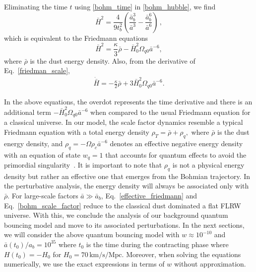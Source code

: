 \documentclass[a4paper,11pt]{article}
\newcommand{\dpar}[1]{\left(#1 \right)}
\begin{document}
Eliminating the time $t$ using \eqref{bohm_time} in \eqref{bohm_hubble}, we find
\begin{equation}
	\label{friedman_scale}
	\bar{H}^{2} = \frac{ 4 }{ 9t^{2}_{b}}\dpar
	{ \frac{ \bar{a}^{3}_{b} }{ \bar{a}^{3} } - \frac{\bar{a}_{b}^{6}}{ \bar{a}^{6} } }\, ,
\end{equation}
which is equivalent to the Friedmann equations
\begin{equation}\label{effective_friedmann}
	\bar{H}^{2} = \frac{\kappa}{ 3 }\bar\rho - \bar{H}^{2}_{0}\Omega_{q0}\bar{a}^{-6},
\end{equation}
where $\bar\rho$ is the dust energy density. {\color{red} Also, from the derivative of
		Eq.~\eqref{friedman_scale},
		\begin{align}
			\dot{\bar{H}} = - \frac{\kappa}{2} \bar\rho + 3\bar{H}^{2}_{0}\Omega_{q0}\bar{a}^{-6}.
		\end{align}
	}

In the above equations, {\color{red} the overdot represents the time derivative and} there is an additional term
$-\bar{H}^{2}_{0}\Omega_{q0}\bar{a}^{-6}$ when compared to the usual Friedmann equation
for a classical universe. {\color{red} In our model, the scale factor dynamics resemble
		a typical Friedmann equation with a total energy density $\rho_{T} = \bar{\rho} +
			\rho_{q},$ where $\bar{\rho}$ is the dust energy density, and $\rho_{q} = -\Omega
			\rho_{c} \bar{a}^{-6}$ denotes an effective negative energy density with an equation of
		state $w_q = 1$ that accounts for quantum effects to avoid the primordial
		singularity~\cite{vitenti2012large}. It is important to note that $\rho_{q}$ is not a
		physical energy density but rather an effective one that emerges from the Bohmian trajectory. In
		the perturbative analysis, the energy density will always be associated only with
		$\bar{\rho}$. For large-scale factors $\bar{a} \gg \bar{a}_{b} $,
		Eq.~\eqref{effective_friedmann} and Eq.~\eqref{bohm_scale_factor} reduce to the
		classical dust dominated a flat FLRW universe. With this, we conclude the analysis of our
		background quantum bouncing model and move to its associated perturbations. In the next
		sections, we will consider the above quantum bouncing model with $w\approx 10^{-10}$ and
		$\bar{a}(t_0)/a_b = 10^{35}$ where $t_0$ is the time during the contracting phase where
		$H(t_0) = -H_0$ for $H_0 = 70 \, \text{km/s/Mpc}$. Moreover, when solving the equations
		numerically, we use the exact expressions in terms of $w$ without approximation.}
\end{document}
